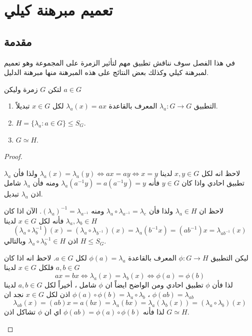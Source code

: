 \chapter{تعميم مبرهنة كيلي}

\section*{مقدمة}

في هذا الفصل سوف نناقش تطبيق مهم لتأثير الزمرة على المجموعة وهو تعميم لمبرهنة كيلي وكذلك بعض النتائج على هذه المبرهنة منها مبرهنة الدليل.

\begin{theorem}
	لتكن $G$ زمرة وليكن $a\in G$
	\begin{enumerate}[label=(\alph*)]
		\item التطبيق $\lambda_a : G \to G$ المعرف بالقاعدة $\lambda_a(x) = ax$ لكل $x\in G$ تبديلاً.
		
		\item $H = \{\lambda_a : a\in G\} \le S_G$.
		
		\item $G \simeq H$.  
	\end{enumerate}
\end{theorem}
\begin{proof}
	\begin{tasks*}
		\item 	لاحظ انه لكل $x, y\in G$ لدينا
		$\lambda_a(x) = \lambda_a(y) \iff ax = ay \iff x = y$ ولذا فأن $\lambda_a$ تطبيق احادي واذا كان $y\in G$ فأنه
		$\lambda_a(a^{-1} y) = a(a^{-1} y) = y$ ومنه فأن $\lambda_a$ شامل اذن $\lambda_a$ تبديل.
		
		\item لاحظ ان $\lambda_a \in H$ ولذا فأن $\lambda_a \circ \lambda_{a^{-1}} = \lambda_e$ ومنه $(\lambda_a)^{-1} = \lambda_{a^{-1}}$. الآن اذا كان $\lambda_a, \lambda_b \in H$ فأنه لكل $x\in G$ لدينا
		\[
		(\lambda_a \circ \lambda_{b}^{-1})(x) = (\lambda_a\circ\lambda_{b^{-1}})(x) = \lambda_a(b^{-1} x) = (ab^{-1})x = \lambda_{ab^{-1}}(x) 
		\] اذن 
		$\lambda_a \circ \lambda_{b}^{-1} \in H$ وبالتالي 
		$H \le S_G$.
		
		\item ليكن التطبيق
		$\phi : G \to H$ المعرف بالقاعدة $\phi(a) = \lambda_a$ لكل $a\in G$. لاحظ انه اذا كان $a, b\in G$ فلكل $x\in G$ لدينا
		\[
		ax = bx \iff \lambda_a(x) = \lambda_b(x) \iff \phi(a) = \phi(b)
		\]
		لذا فأن $\phi$ تطبيق احادي ومن الواضح ايضاً ان $\phi$ شامل ، أخيراً لكل $a, b\in G$ لدينا
		$\phi(ab) = \lambda_{ab}$ ، $\phi(a) \circ \phi(b) = \lambda_a \circ \lambda_b$ اذن لكل $x\in G$ نجد ان
		\[
		\lambda_{ab}(x) = (ab) x = a(b x) = \lambda_a(bx) = \lambda_a(\lambda_{b}(x)) = (\lambda_a \circ \lambda_b) (x)
		\]
		لذا فأنه 
		$\phi(ab) = \phi(a) \circ \phi(b)$ اي ان $\phi$ تشاكل اذن $G\simeq H$.
		
	\end{tasks*}
\end{proof}

